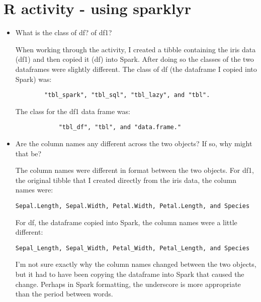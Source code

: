 \documentclass{article}
\begin{document}
\section{R activity - using sparklyr}
\begin{itemize}
    \item What is the class of df? of df1?
    
    When working through the activity, I created a tibble containing the iris data (df1) and then copied it (df) into Spark. After doing so the classes of the two dataframes were slightly different. The class of df (the dataframe I copied into Spark) was: \begin{verbatim} 
        "tbl_spark", "tbl_sql", "tbl_lazy", and "tbl". \end{verbatim} 
    The class for the df1 data frame was: 
    \begin{verbatim} 
            "tbl_df", "tbl", and "data.frame."
    \end{verbatim}
    
    \item Are the column names any different across the two objects? If so, why might that be? 
    
    The column names were different in format between the two objects. For df1, the original tibble that I created directly from the iris data, the column names were: 
    \begin{verbatim}Sepal.Length, Sepal.Width, Petal.Width, Petal.Length, and Species\end{verbatim}
    For df, the dataframe copied into Spark, the column names were a little different: 
    \begin{verbatim}Sepal_Length, Sepal_Width, Petal_Width, Petal_Length, and Species \end{verbatim}
    I'm not sure exactly why the column names changed between the two objects, but it had to have been copying the dataframe into Spark that caused the change. Perhaps in Spark formatting, the underscore is more appropriate than the period between words. 
\end{itemize}
\end{document}
